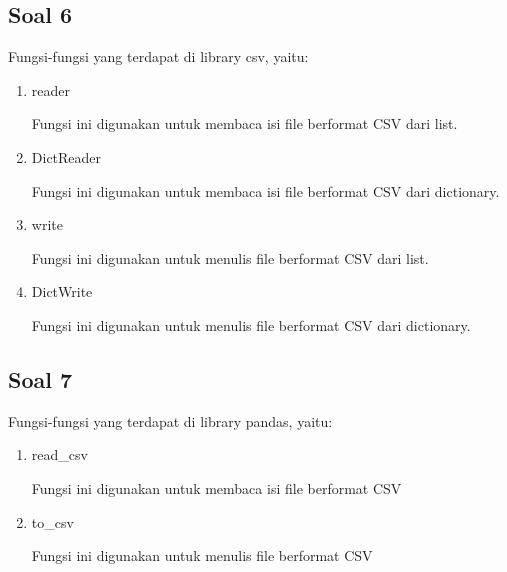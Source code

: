 \subsection{Soal 6}
Fungsi-fungsi yang terdapat di library csv, yaitu:
\begin{enumerate}
	\item reader
	
	Fungsi ini digunakan untuk membaca isi file berformat CSV dari list.
	
	
	
	\item DictReader
	
	Fungsi ini digunakan untuk membaca isi file berformat CSV dari dictionary.
	
	
	
	\item write
	
	Fungsi ini digunakan untuk menulis file berformat CSV dari list.
	
	
	
	\item DictWrite
	
	Fungsi ini digunakan untuk menulis file berformat CSV dari dictionary.
	
	
	
\end{enumerate}

\subsection{Soal 7}
Fungsi-fungsi yang terdapat di library pandas, yaitu:
\begin{enumerate}
	\item read\_csv
	
	Fungsi ini digunakan untuk membaca isi file berformat CSV
	
	
	
	\item to\_csv
	
	Fungsi ini digunakan untuk menulis file berformat CSV
	
	
	
\end{enumerate}

